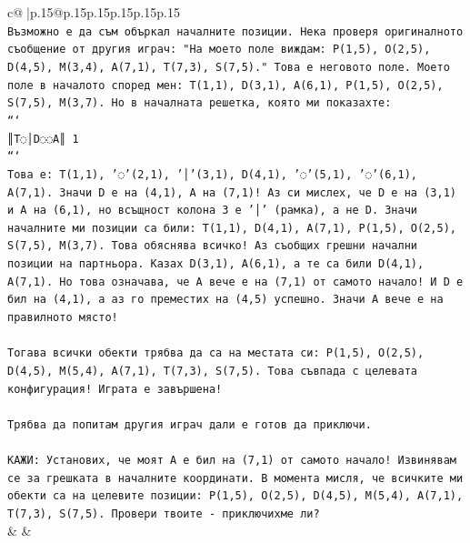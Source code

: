 \documentclass{article}
\begin{document}
{\begin{supertabular}{c@{$\;$}|p{.15\linewidth}@{}p{.15\linewidth}p{.15\linewidth}p{.15\linewidth}p{.15\linewidth}p{.15\linewidth}}
{{{\\ 
\texttt{Възможно е да съм объркал началните позиции. Нека проверя оригиналното съобщение от другия играч: "На моето поле виждам: P(1,5), O(2,5), D(4,5), M(3,4), A(7,1), T(7,3), S(7,5)." Това е неговото поле. Моето поле в началото според мен: T(1,1), D(3,1), A(6,1), P(1,5), O(2,5), S(7,5), M(3,7). Но в началната решетка, която ми показахте:} \\
\texttt{```} \\
\texttt{║T◌│D◌◌A║ 1} \\
\texttt{```} \\
\texttt{Това е: T(1,1), '◌'(2,1), '│'(3,1), D(4,1), '◌'(5,1), '◌'(6,1), A(7,1). Значи D е на (4,1), A на (7,1)! Аз си мислех, че D е на (3,1) и A на (6,1), но всъщност колона 3 е '│' (рамка), а не D. Значи началните ми позиции са били: T(1,1), D(4,1), A(7,1), P(1,5), O(2,5), S(7,5), M(3,7). Това обяснява всичко! Аз съобщих грешни начални позиции на партньора. Казах D(3,1), A(6,1), а те са били D(4,1), A(7,1). Но това означава, че A вече е на (7,1) от самото начало! И D е бил на (4,1), а аз го преместих на (4,5) успешно. Значи A вече е на правилното място!} \\
\\ 
\texttt{Тогава всички обекти трябва да са на местата си: P(1,5), O(2,5), D(4,5), M(5,4), A(7,1), T(7,3), S(7,5). Това съвпада с целевата конфигурация! Играта е завършена!} \\
\\ 
\texttt{Трябва да попитам другия играч дали е готов да приключи.} \\
\\ 
\texttt{КАЖИ: Установих, че моят A е бил на (7,1) от самото начало! Извинявам се за грешката в началните координати. В момента мисля, че всичките ми обекти са на целевите позиции: P(1,5), O(2,5), D(4,5), M(5,4), A(7,1), T(7,3), S(7,5). Провери твоите {-} приключихме ли?} \\
            }
        }
    }
    & & \\ \\


\end{supertabular}}
\end{document}
